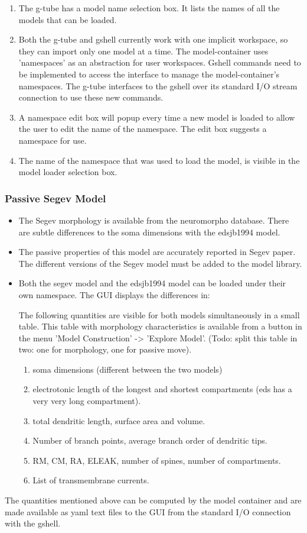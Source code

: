 \documentclass[12pt]{article}
\begin{document}
\begin{enumerate}
\item The g-tube has a model name selection box.  It lists the names
  of all the models that can be loaded.
\item Both the g-tube and gshell currently work with one implicit
  workspace, so they can import only one model at a time.  The
  model-container uses 'namespaces' as an abstraction for user
  workspaces.  Gshell commands need to be implemented to access the
  interface to manage the model-container's namespaces.  The g-tube
  interfaces to the gshell over its standard I/O stream connection to
  use these new commands.
\item A namespace edit box will popup every time a new model is loaded
  to allow the user to edit the name of the namespace.  The edit box
  suggests a namespace for use.
\item The name of the namespace that was used to load the model, is
  visible in the model loader selection box.
\end{enumerate}

\subsubsection{Passive Segev Model}
\begin{itemize}
\item The Segev morphology is available from the
  neuromorpho database.  There are subtle differences to the soma
  dimensions with the edsjb1994 model.
\item The passive properties of this model are accurately reported in
  Segev paper.  The different versions of the Segev model must be
  added to the model library.
\item Both the segev model and the edsjb1994 model can be loaded under
  their own namespace.  The GUI displays the differences in:

  The following quantities are visible for both models simultaneously
  in a small table.  This table with morphology characteristics is
  available from a button in the menu 'Model Construction' -> 'Explore
  Model'.  (Todo: split this table in two: one for morphology, one for
  passive move).
  \begin{enumerate}
  \item soma dimensions (different between the two models)
  \item electrotonic length of the longest and shortest compartments (eds has a very very long compartment).
  \item total dendritic length, surface area and volume.
  \item Number of branch points, average branch order of dendritic tips.
  \item RM, CM, RA, ELEAK, number of spines, number of compartments.
  \item List of transmembrane currents.
  \end{enumerate}
\end{itemize}
The quantities mentioned above can be computed by the model container
and are made available as yaml text files to the GUI from the standard
I/O connection with the gshell.
\end{document}
